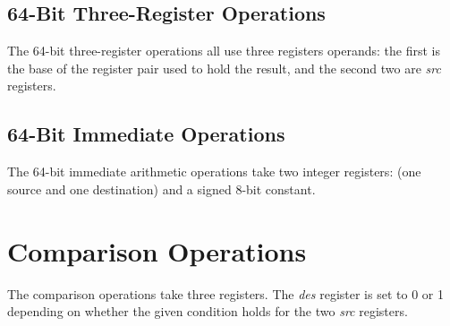 \subsection{64-Bit Three-Register Operations}

The 64-bit three-register operations all use three registers operands: 
the first is the base of the register pair used to hold the result,
and the second two are {\em src} registers.

\begin{description}

\item	{}
\item	{}
\item	{}

\end{description}

\subsection{64-Bit Immediate Operations}

The 64-bit immediate arithmetic operations take two integer registers: 
(one source and one destination) and a signed 8-bit constant.

\begin{description}

\item {}
\item {}
\item {}

\end{description}

\section{Comparison Operations}

The comparison operations take three registers.  The {\em des}
register is set to 0 or 1 depending on whether the given condition
holds for the two {\em src} registers.

\begin{description}

\item	{}
\item	{}
\item	{}
\item	{}
\item	{}

\end{description}

